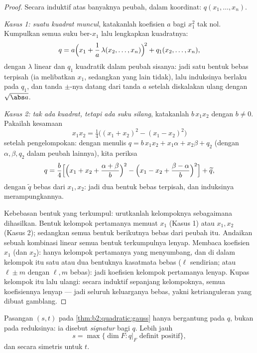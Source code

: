 \begin{proof}
Secara induktif atas banyaknya peubah, dalam koordinat: $q(x_1,
\dots, x_n)$.

\emph{Kasus 1: suatu kuadrat muncul}, katakanlah koefisien $a$ bagi
$x_1^2$ tak nol. Kumpulkan semua suku ber-$x_1$ lalu lengkapkan
kuadratnya:
\[
q = a\Bigl(x_1 + \frac{1}{a}\,\lambda(x_2, \dots,
x_n)\Bigr)^{\!2} + q_1(x_2, \dots, x_n),
\]
dengan $\lambda$ linear dan $q_1$ kuadratik dalam peubah sisanya:
jadi satu bentuk bebas terpisah (ia melibatkan $x_1$, sedangkan
yang lain tidak), lalu induksinya berlaku pada $q_1$, dan tanda $\pm$-nya
datang dari tanda $a$ setelah diskalakan ulang dengan $\sqrt{\abs a}$.

\emph{Kasus 2: tak ada kuadrat, tetapi ada suku silang}, katakanlah
$b\,x_1x_2$ dengan $b \neq 0$. Pakailah kesamaan
\[
x_1x_2 = \tfrac14\bigl((x_1 + x_2)^2 - (x_1 - x_2)^2\bigr)
\]
setelah pengelompokan: dengan menulis $q = b\,x_1x_2 + x_1\alpha +
x_2\beta + q_2$ (dengan $\alpha, \beta, q_2$ dalam peubah lainnya), kita periksa
\[
q = \frac{b}{4}\Bigl[\Bigl(x_1 + x_2 + \frac{\alpha +
\beta}{b}\Bigr)^{2} - \Bigl(x_1 - x_2 + \frac{\beta -
\alpha}{b}\Bigr)^{2}\Bigr] + \widetilde q ,
\]
dengan $\widetilde q$ bebas dari $x_1, x_2$: jadi dua bentuk bebas
terpisah, dan induksinya merampungkannya.

Kebebasan bentuk yang terkumpul: urutkanlah kelompoknya sebagaimana
dihasilkan. Bentuk kelompok pertamanya memuat $x_1$ (Kasus 1)
atau $x_1, x_2$ (Kasus 2); sedangkan semua bentuk berikutnya bebas dari
peubah itu. Andaikan sebuah kombinasi linear semua bentuk terkumpulnya
lenyap. Membaca koefisien $x_1$ (dan $x_2$): hanya
kelompok pertamanya yang menyumbang, dan di dalam kelompok itu satu atau
dua bentuknya kasatmata bebas ($\ell$ sendirian; atau $\ell \pm
m$ dengan $\ell, m$ bebas): jadi koefisien kelompok pertamanya
lenyap. Kupas kelompok itu lalu ulangi: secara induktif sepanjang
kelompoknya, semua koefisiennya lenyap --- jadi seluruh keluarganya bebas,
yakni ketrianguleran yang dibuat gamblang.
\end{proof}

\begin{theorem}\label{thm:b2:quadratic:sylvester}
Pasangan $(s, t)$ pada \cref{thm:b2:quadratic:gauss} hanya bergantung
pada $q$, bukan pada reduksinya: ia disebut
\emph{signatur} bagi $q$.
Lebih jauh
\[
s = \max\{\dim F : q|_F \text{ definit positif}\},
\]
dan secara simetris untuk $t$.
\end{theorem}

